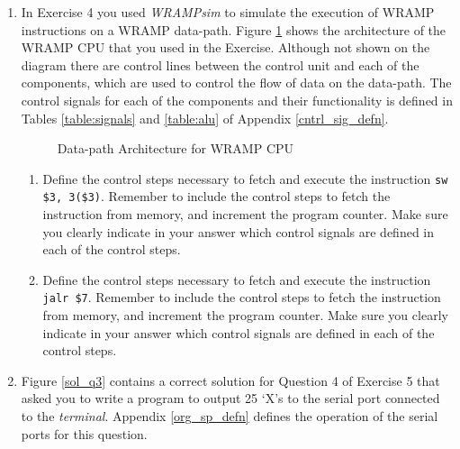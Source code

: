 \documentclass[a4paper,10pt]{article}
\begin{document}
\begin{enumerate}


\item  In Exercise 4 you used \emph{WRAMPsim} to simulate the
execution of WRAMP instructions on a WRAMP data-path. Figure
\ref{fig:wrampblok} shows the architecture of the WRAMP CPU that
you used in the Exercise. Although not shown on the diagram there are
control lines between the control unit and each of the components,
which are used to control the flow of data on the data-path. The
control signals for each of the components and their functionality is
defined in Tables \ref{table:signals} and
\ref{table:alu} of Appendix \ref{cntrl_sig_defn}. 

\begin{figure}[h]
\begin{center}
    \caption{Data-path Architecture for WRAMP CPU}
    \label{fig:wrampblok}
  \end{center}
\end{figure}


\begin{enumerate} 

  \item Define the control steps necessary to fetch and execute the
  instruction \texttt{sw \$3, 3(\$3)}. Remember to include the control steps
  to fetch the instruction from memory, and increment the program counter.
  Make sure you clearly indicate in your answer which control signals are
  defined in each of the control steps.


  \item Define the control steps necessary to fetch and execute the
  instruction \texttt{jalr \$7}. Remember to include the control steps
  to fetch the instruction from memory, and increment the program counter.
  Make sure you clearly indicate in your answer which control signals are
  defined in each of the control steps.


\end{enumerate}

\newpage
\item Figure \ref{sol_q3} contains a correct solution for Question 4
of Exercise 5 that asked you to write a program to output 25 `X's to
the serial port connected to the \emph{terminal}. Appendix
\ref{org_sp_defn} defines the operation of the serial ports for this
question.


\end{enumerate}
\end{document}
